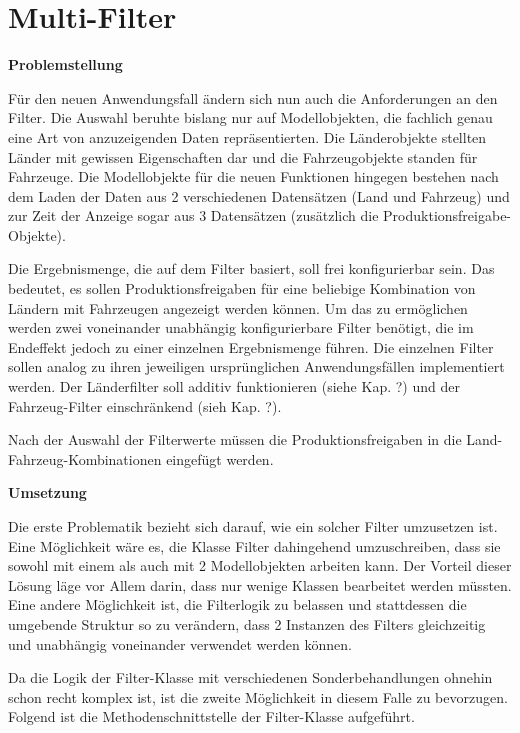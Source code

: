 \section{Multi-Filter} \label{sec:implMulti-Filter}
\textbf{Problemstellung}

Für den neuen Anwendungsfall ändern sich nun auch die Anforderungen an den Filter. Die Auswahl beruhte bislang nur auf Modellobjekten, die fachlich genau eine Art von anzuzeigenden Daten repräsentierten. Die Länderobjekte stellten Länder mit gewissen Eigenschaften dar und die Fahrzeugobjekte standen für Fahrzeuge. Die Modellobjekte für die neuen Funktionen hingegen bestehen nach dem Laden der Daten aus 2 verschiedenen Datensätzen (Land und Fahrzeug) und zur Zeit der Anzeige sogar aus 3 Datensätzen (zusätzlich die Produktionsfreigabe-Objekte).

Die Ergebnismenge, die auf dem Filter basiert, soll frei konfigurierbar sein. Das bedeutet, es sollen Produktionsfreigaben für eine beliebige Kombination von Ländern mit Fahrzeugen angezeigt werden können. Um das zu ermöglichen werden zwei voneinander unabhängig konfigurierbare Filter benötigt, die im Endeffekt jedoch zu einer einzelnen Ergebnismenge führen. Die einzelnen Filter sollen analog zu ihren jeweiligen ursprünglichen Anwendungsfällen implementiert werden. Der Länderfilter soll additiv funktionieren (siehe Kap. ?) und der Fahrzeug-Filter einschränkend (sieh Kap. ?).

Nach der Auswahl der Filterwerte müssen die Produktionsfreigaben in die Land-Fahrzeug-Kombinationen eingefügt werden.

\textbf{Umsetzung}

Die erste Problematik bezieht sich darauf, wie ein solcher Filter umzusetzen ist. Eine Möglichkeit wäre es, die Klasse Filter dahingehend umzuschreiben, dass sie sowohl mit einem als auch mit 2 Modellobjekten arbeiten kann. Der Vorteil dieser Lösung läge vor Allem darin, dass nur wenige Klassen bearbeitet werden müssten.
Eine andere Möglichkeit ist, die Filterlogik zu belassen und stattdessen die umgebende Struktur so zu verändern, dass 2 Instanzen des Filters gleichzeitig und unabhängig voneinander verwendet werden können.

Da die Logik der Filter-Klasse mit verschiedenen Sonderbehandlungen ohnehin schon recht komplex ist, ist die zweite Möglichkeit in diesem Falle zu bevorzugen.
Folgend ist die Methodenschnittstelle der Filter-Klasse aufgeführt.

